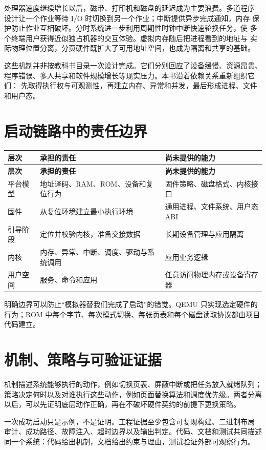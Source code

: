 处理器速度继续增长以后，磁带、打印机和磁盘的延迟成为主要浪费。多道程序
设计让一个作业等待 I/O 时切换到另一个作业；中断提供异步完成通知，内存
保护防止作业互相破坏。分时系统进一步利用周期性时钟中断快速轮换任务，使
多个终端用户获得近似独占机器的交互体验。虚拟内存随后把进程看到的地址与
实际物理位置分离，分页硬件既扩大了可用地址空间，也成为隔离和共享的基础。

这些机制并非按教科书目录一次设计完成。它们分别回应了设备缓慢、资源昂贵、
程序错误、多人共享和软件规模增长等现实压力。本书沿着依赖关系重新组织它们：
先取得执行权与可观测性，再建立内存、异常和并发，最后形成进程、文件和用户态。

\section{启动链路中的责任边界}

\begin{longtable}{L{0.20\textwidth}L{0.32\textwidth}L{0.34\textwidth}}
\toprule
\textbf{层次} & \textbf{承担的责任} & \textbf{尚未提供的能力}\\
\midrule
\endfirsthead
\toprule
\textbf{层次} & \textbf{承担的责任} & \textbf{尚未提供的能力}\\
\midrule
\endhead
平台模型 & 地址译码、RAM、ROM、设备和复位行为 & 固件策略、磁盘格式、内核接口\\
固件 & 从复位环境建立最小执行环境 & 通用进程、文件系统、用户态 ABI\\
引导阶段 & 定位并校验内核，准备交接数据 & 长期设备管理与应用隔离\\
内核 & 内存、异常、中断、调度、驱动与系统调用 & 应用业务逻辑\\
用户空间 & 服务、命令和应用 & 任意访问物理内存或设备寄存器\\
\bottomrule
\end{longtable}

明确边界可以防止“模拟器替我们完成了启动”的错觉。QEMU 只实现选定硬件的
行为；ROM 中每个字节、每次模式切换、每张页表和每个磁盘读取协议都由项目
代码建立。

\section{机制、策略与可验证证据}

机制描述系统能够执行的动作，例如切换页表、屏蔽中断或把任务放入就绪队列；
策略决定何时以及对谁执行这些动作，例如页面替换算法和调度优先级。两者分离
以后，可以先证明底层动作正确，再在不破坏硬件契约的前提下更换策略。

一次成功启动只是示例，不是证明。工程证据至少包含可复现构建、二进制布局
审计、成功路径、故障注入、超时边界以及输出判定。代码、文档和测试共同描述
同一个系统：代码给出机制，文档给出约束与理由，测试验证外部可观察行为。
